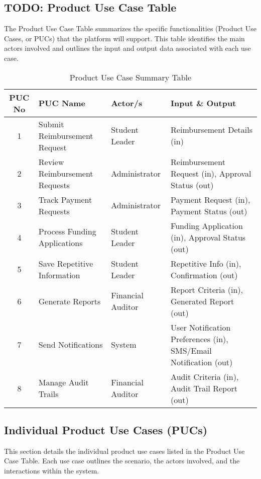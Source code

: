 \documentclass[12pt]{article}
\begin{document}
\subsection{TODO: Product Use Case Table}
The Product Use Case Table summarizes the specific functionalities (Product Use Cases, or PUCs) that the platform will support. This table identifies the main actors involved and outlines the input and output data associated with each use case.

\begin{table}[h]
    \centering
    \caption{Product Use Case Summary Table}
    \begin{tabular}{|c|l|l|l|}
        \hline
        \textbf{PUC No} & \textbf{PUC Name} & \textbf{Actor/s} & \textbf{Input \& Output} \\ \hline
        1 & Submit Reimbursement Request & Student Leader & Reimbursement Details (in) \\ \hline
        2 & Review Reimbursement Requests & Administrator & Reimbursement Request (in), Approval Status (out) \\ \hline
        3 & Track Payment Requests & Administrator & Payment Request (in), Payment Status (out) \\ \hline
        4 & Process Funding Applications & Student Leader & Funding Application (in), Approval Status (out) \\ \hline
        5 & Save Repetitive Information & Student Leader & Repetitive Info (in), Confirmation (out) \\ \hline
        6 & Generate Reports & Financial Auditor & Report Criteria (in), Generated Report (out) \\ \hline
        7 & Send Notifications & System & User Notification Preferences (in), SMS/Email Notification (out) \\ \hline
        8 & Manage Audit Trails & Financial Auditor & Audit Criteria (in), Audit Trail Report (out) \\ \hline
    \end{tabular}
\end{table}

\subsection{Individual Product Use Cases (PUCs)}
This section details the individual product use cases listed in the Product Use Case Table. Each use case outlines the scenario, the actors involved, and the interactions within the system.
\end{document}
